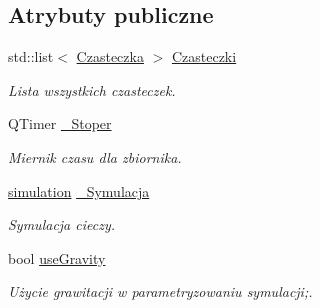 \subsection*{Atrybuty publiczne}
\begin{DoxyCompactItemize}
\item 
std\-::list$<$ \hyperlink{class_czasteczka}{Czasteczka} $>$ \hyperlink{class_zbiornik_a751209f2f02a7eaf3b7a3283d8fcd3ad}{Czasteczki}
\begin{DoxyCompactList}\small\item\em Lista wszystkich czasteczek. \end{DoxyCompactList}\item 
Q\-Timer \hyperlink{class_zbiornik_a5ca8ac1357ef59110d4a9e12aae2bd99}{\-\_\-\-Stoper}
\begin{DoxyCompactList}\small\item\em Miernik czasu dla zbiornika. \end{DoxyCompactList}\item 
\hyperlink{classsimulation}{simulation} \hyperlink{class_zbiornik_a2d1f5a0b8fb0085afcd66b730d6dd6a8}{\-\_\-\-Symulacja}
\begin{DoxyCompactList}\small\item\em Symulacja cieczy. \end{DoxyCompactList}\item 
bool \hyperlink{class_zbiornik_adf42e0df5f2af3160a1ff2e1360efe8a}{use\-Gravity}
\begin{DoxyCompactList}\small\item\em Użycie grawitacji w parametryzowaniu symulacji;. \end{DoxyCompactList}\end{DoxyCompactItemize}
